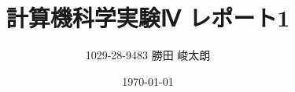 



\title{計算機科学実験Ⅳ レポート1}
\author{1029-28-9483 勝田 峻太朗}
\date{\today}
\maketitle

\begin{comment}

\section*{課題1 (拡張構文: 任意)}

\subsection*{階乗計算}

\begin{lstlisting}[caption=階乗計算]
    let fact n =
    loop v = (n, 1) in
    if v.1 > 1 then
    recur (v.1 - 1, v.2 * v.1)
    else v.2
\end{lstlisting}

\subsection*{フィボナッチ数}

\begin{lstlisting}[caption=フィボナッチ数の計算]
    let fib n = 
    loop v = (n, (1, 0)) in
    if v.1 > 1 then 
    let tmp1 = v.2.1 in
    let tmp2 = v.2.1 + v.2.2 in
    recur (v.1 - 1, (tmp2, tmp1))
    else v.2.1 + v.2.2
\end{lstlisting}

\section*{課題2 (フロントエンド: 必須)}

\begin{quotation}
MiniMLの文法規則に従うMiniMLプログラムを入力とし,以下の \lstinline{syntax.ml} により定義される抽象構文木を返す字句解析器・構文解析器を作成しなさい.
\end{quotation}

字句解析器・構文解析器ともに実験Ⅲの実装を参考にした.

\subsection*{字句解析器}


\end{comment}
